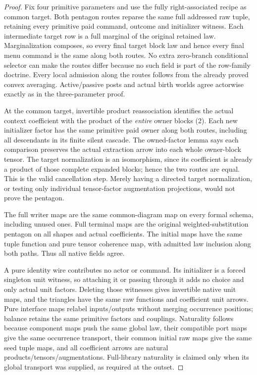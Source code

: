 \documentclass[11pt]{article}
\begin{document}
\begin{proof}
Fix four primitive parameters and use the fully right-associated recipe as common target. Both pentagon routes reparse the same full addressed raw tuple, retaining every primitive paid command, outcome and initializer witness. Each intermediate target row is a full marginal of the original retained law. Marginalization composes, so every final target block law and hence every final menu command is the same along both routes. No extra zero-branch conditional selector can make the routes differ because no such field is part of the row-family doctrine. Every local admission along the routes follows from the already proved convex averaging. Active/passive posts and actual birth worlds agree actorwise exactly as in the three-parameter proof.

At the common target, invertible product reassociation identifies the actual context coefficient with the product of the \emph{entire} owner blocks (2). Each new initializer factor has the same primitive paid owner along both routes, including all descendants in its finite silent cascade. The owned-factor lemma says each comparison preserves the actual extraction arrow into each whole owner-block tensor. The target normalization is an isomorphism, since its coefficient is already a product of those complete expanded blocks; hence the two routes are equal. This is the valid cancellation step. Merely having a directed target normalization, or testing only individual tensor-factor augmentation projections, would not prove the pentagon.

The full writer maps are the same common-diagram map on every formal schema, including unused ones. Full terminal maps are the original weighted-substitution pentagon on all shapes and actual coefficients. The initial maps have the same tuple function and pure tensor coherence map, with admitted law inclusion along both paths. Thus all native fields agree.

A pure identity wire contributes no actor or command. Its initializer is a forced singleton unit witness, so attaching it or passing through it adds no choice and only actual unit factors. Deleting those witnesses gives invertible native unit maps, and the triangles have the same raw functions and coefficient unit arrows. Pure interface maps relabel inputs/outputs without merging occurrence positions; balance retains the same primitive factors and couplings. Naturality follows because component maps push the same global law, their compatible port maps give the same occurrence transport, their common initial raw maps give the same seed tuple maps, and all coefficient arrows are natural products/tensors/augmentations. Full-library naturality is claimed only when its global transport was supplied, as required at the outset.\end{proof}
\end{document}
